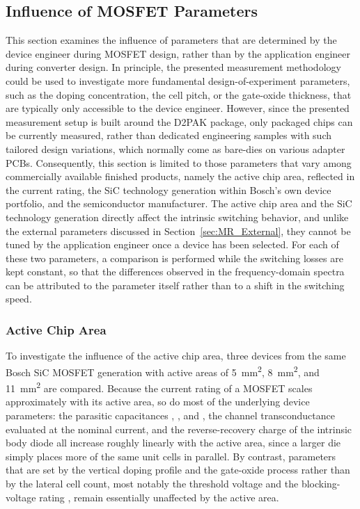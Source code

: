 \subsection{Influence of MOSFET Parameters}
\label{sec:MR_MOSFET}

This section examines the influence of parameters that are determined by the device engineer during MOSFET design, rather than by the application engineer during converter design.
In principle, the presented measurement methodology could be used to investigate more fundamental design-of-experiment parameters, such as the doping concentration, the cell pitch, or the gate-oxide thickness, that are typically only accessible to the device engineer.
However, since the presented measurement setup is built around the D2PAK package, only packaged chips can be currently measured, rather than dedicated engineering samples with such tailored design variations, which normally come as bare-dies on various adapter PCBs.
Consequently, this section is limited to those parameters that vary among commercially available finished products, namely the active chip area, reflected in the current rating, the SiC technology generation within Bosch's own device portfolio, and the semiconductor manufacturer.
The active chip area and the SiC technology generation directly affect the intrinsic switching behavior, and unlike the external parameters discussed in Section~\ref{sec:MR_External}, they cannot be tuned by the application engineer once a device has been selected.
For each of these two parameters, a comparison is performed while the switching losses are kept constant, so that the differences observed in the frequency-domain spectra can be attributed to the parameter itself rather than to a shift in the switching speed.

\subsubsection*{Active Chip Area}

To investigate the influence of the active chip area, three devices from the same Bosch SiC MOSFET generation with active areas of \SI{5}{mm^2}, \SI{8}{mm^2}, and \SI{11}{mm^2} are compared.
Because the current rating of a MOSFET scales approximately with its active area, so do most of the underlying device parameters: the parasitic capacitances , , and , the channel transconductance  evaluated at the nominal current, and the reverse-recovery charge  of the intrinsic body diode all increase roughly linearly with the active area, since a larger die simply places more of the same unit cells in parallel.
By contrast, parameters that are set by the vertical doping profile and the gate-oxide process rather than by the lateral cell count, most notably the threshold voltage  and the blocking-voltage rating , remain essentially unaffected by the active area.


